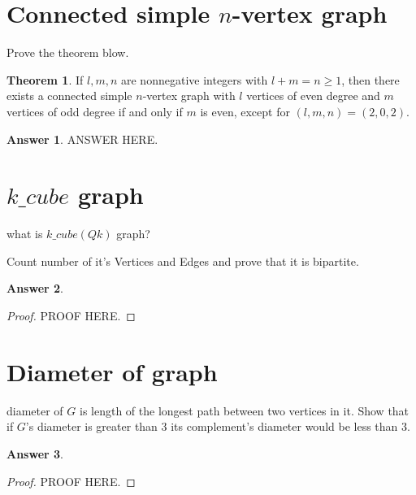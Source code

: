 \documentclass[a4paper]{article}
\renewcommand{\(}{\left(}
\renewcommand{\)}{\right)}
\theoremstyle{plain}
\theoremstyle{plain}
\theoremstyle{definition}
\newtheorem*{answer}{Answer}
\newtheorem{theorem}{Theorem}[section]
\begin{document}
\section{Connected simple $n$-vertex graph}
Prove the theorem blow.
\begin{theorem}
If $l, m, n$ are nonnegative integers with $l + m = n \geq 1$, then there exists a connected simple $n$-vertex
graph with $l$ vertices of even degree and $m$ vertices of odd degree if and only if $m$ is even,
except for $(l, m, n) = (2, 0, 2)$.
\end{theorem}
\begin{shaded}
\begin{answer}
ANSWER HERE.
\end{answer}
\end{shaded}



\section{$k\_cube$ graph}
what is $k\_cube(Qk)$ graph?

Count number of it's Vertices and Edges and prove that it is bipartite.
\begin{shaded}
\begin{answer}
\begin{proof}
PROOF HERE.
\end{proof}
\end{answer}
\end{shaded}

\section{Diameter of graph}
diameter of $G$ is length of the longest path between two vertices in it.
Show that if $G$'s diameter is greater than 3 its complement's diameter would be less than 3.
\begin{shaded}
\begin{answer}
\begin{proof}
PROOF HERE.
\end{proof}
\end{answer}
\end{shaded}
\end{document}
